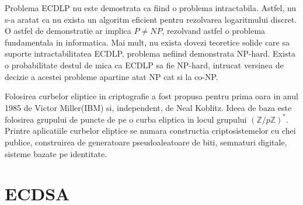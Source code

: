 \begin{obs}
Problema ECDLP nu este demostrata ca fiind o problema intractabila. Astfel, nu s-a aratat ca nu exista un algoritm eficient pentru rezolvarea logaritmului discret. O astfel de demonstratie ar implica $P\neq NP$, rezolvand astfel o problema fundamentala in informatica. Mai mult, nu exista dovezi teoretice solide care sa suporte intractabilitatea ECDLP, problema nefiind demonstrata NP-hard. Exista o probabilitate destul de mica ca ECDLP sa fie NP-hard, intrucat versinea de decizie a acestei probleme apartine atat NP cat si la co-NP.
\end{obs}


Folosirea curbelor eliptice in criptografie a fost propusa pentru prima oara in anul 1985 de Victor Miller(IBM) si, independent, de Neal Koblitz. Ideea de baza este folosirea grupului de puncte de pe o curba eliptica in locul grupului $(\mathbb{Z}/p\mathbb{Z})^{*}$. Printre aplicatiile curbelor eliptice se numara constructia criptosistemelor cu chei publice, construirea de generatoare pseudoaleatoare de biti, semnaturi digitale, sisteme bazate pe identitate.

\section{ECDSA}
